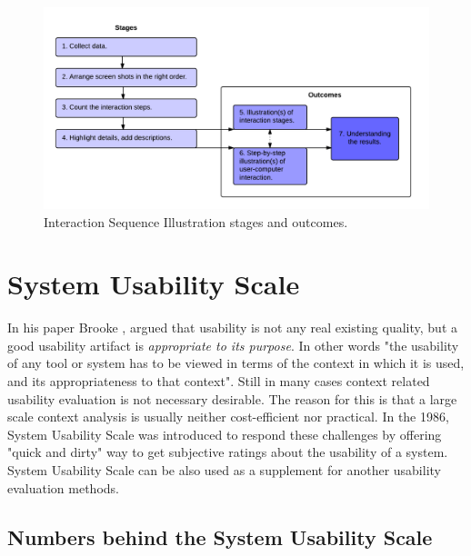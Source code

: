 \documentclass[12pt,a4paper,oneside,pdftex]{report}
\begin{document}
\begin{figure}[H]
  	\centering
  	\includegraphics[width=1.1\textwidth]{./images/isi_chart.png}
  	\caption{Interaction Sequence Illustration stages and outcomes.}
	\label{fig:isi_chart}
\end{figure}

\section{System Usability Scale}
\label{sec:sus}
In his paper Brooke \cite{RefWorks:10}, argued that usability is not any real existing quality, but a good usability artifact is \emph{appropriate to its purpose}. In other words "the usability of any tool or system has to be viewed in terms of the context in which it is 			used, and its appropriateness to that context"\cite{RefWorks:10}. Still in many cases context related usability evaluation is not necessary desirable. The reason for this is that a large scale context analysis is usually neither cost-efficient nor practical.\cite{RefWorks:10} In the 1986, System Usability Scale was introduced to respond these challenges by offering "quick and dirty"\cite{RefWorks:10} way to get subjective ratings about the usability of a system. \cite{RefWorks:12, RefWorks:35} System Usability Scale can be also used as a supplement for another usability evaluation methods.




\subsection{Numbers behind the System Usability Scale}
\end{document}
